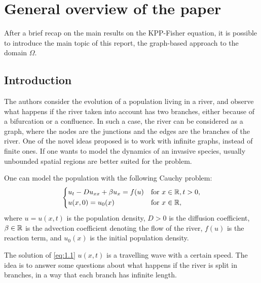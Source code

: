 \section{General overview of the paper} 
After a brief recap on the main results on the KPP-Fisher equation, it is possible to introduce the main topic of this report, the graph-based approach to the domain \(\Omega\). 
\subsection{Introduction}
The authors consider the evolution of a population living in a river, and observe what happens if the river taken into account has two branches, either because of a bifurcation or a confluence. In such a case, the river can be considered as a graph, where the nodes are the junctions and the edges are the branches of the river. One of the novel ideas proposed is to work with infinite graphs, instead of finite ones. If one wants to model the dynamics of an invasive species, usually unbounded spatial regions are better suited for the problem.

One can model the population with the following Cauchy problem:
\begin{equation}
    \begin{dcases}
        u_t - Du_{xx} + \beta u_x = f(u) & \text{for } x \in \mathbb{R}, t > 0, \\
        u(x, 0) = u_0(x) & \text{for } x \in \mathbb{R},
    \end{dcases}
    \label{eq:1.1}
\end{equation}
where \(u = u(x, t)\) is the population density, \(D > 0\) is the diffusion coefficient, \(\beta \in \mathbb{R}\) is the advection coefficient denoting the flow of the river, \(f(u)\) is the reaction term, and \(u_0(x)\) is the initial population density.

The solution of \eqref{eq:1.1} \(u(x, t)\) is a travelling wave with a certain speed. The idea is to answer some questions about what happens if the river is split in branches, in a way that each branch has infinite length. 

